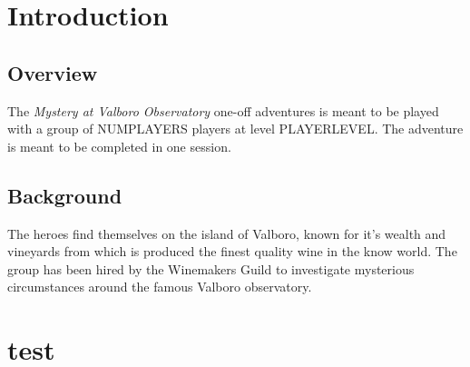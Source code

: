 \section{Introduction}

\begin{multicols*}{2}
	\subsection*{Overview}
	The \emph{Mystery at Valboro Observatory} one-off adventures is meant to be played with a group of NUMPLAYERS players at level PLAYERLEVEL. The adventure is meant to be completed in one session.
	
	\subsection*{Background}
	The heroes find themselves on the island of Valboro, known for it's wealth and vineyards from which is produced the finest quality wine in the know world. The group has been hired by the Winemakers Guild to investigate mysterious circumstances around the famous Valboro observatory. 

\end{multicols*}
\section{test}